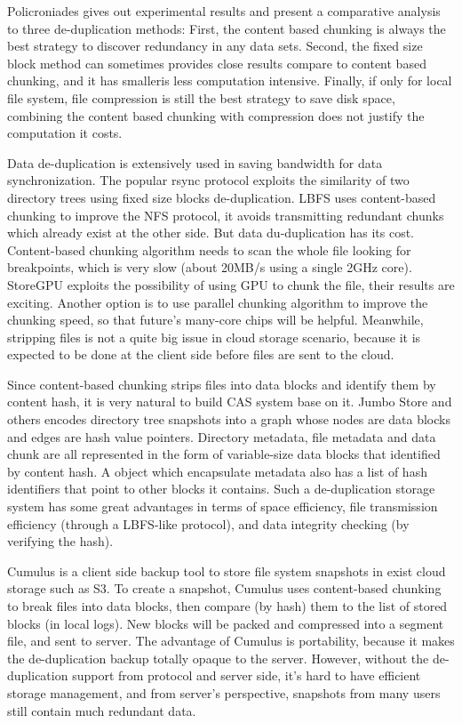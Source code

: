 Policroniades\cite{poli04} gives out
experimental results and present a comparative analysis
to three de-duplication methods: First, the content based chunking
is always the best strategy to discover redundancy in any data sets.
Second, the fixed size block method can sometimes provides
close results compare to content based chunking, and it has smalleris less
computation intensive. Finally, if only for local file system,
file compression is still the
best strategy to save disk space, combining the content based chunking
with compression does not justify the computation it costs.

Data de-duplication is extensively used in saving bandwidth for data synchronization.
The popular rsync\cite{rsync} protocol exploits the similarity of two directory trees
using fixed size blocks de-duplication. 
LBFS uses content-based chunking to improve the NFS protocol, 
it avoids transmitting redundant chunks which already exist at the other side.
But data du-duplication has its cost. Content-based chunking algorithm needs to
scan the whole file looking for breakpoints, which is very slow (about 20MB/s using a single 2GHz core). 
StoreGPU\cite{storegpu08}
exploits the possibility of using GPU to chunk the file,
their results are exciting. Another option is to use parallel
chunking algorithm to improve the chunking speed,
so that future's many-core chips will be helpful. 
Meanwhile, stripping files is not a quite big issue in cloud storage scenario,
because it is expected to be done at the client side before files are
sent to the cloud.

Since content-based chunking strips files into data blocks 
and identify them by content hash,
it is very natural to build CAS system base on it.
Jumbo Store and others\cite{jumbo07,efficient_dedup05,you06} encodes directory tree snapshots
into a graph whose nodes are data blocks and edges
are hash value pointers.
Directory metadata, file metadata and data chunk are all
represented in the form of variable-size data blocks that identified by content hash.
A object which encapsulate metadata also has a list of hash identifiers 
that point to other blocks it contains.
Such a de-duplication storage system has some great advantages 
in terms of space efficiency, file transmission efficiency (through a LBFS-like protocol), 
and data integrity checking (by verifying the hash).

Cumulus\cite{cumulus09} is a client side backup tool to store 
file system snapshots in exist cloud storage such as S3.
To create a snapshot, Cumulus uses content-based chunking to break files into data blocks,
then compare (by hash) them to the list of stored blocks (in local logs).
New blocks will be packed and compressed into a segment file, and sent to server.
The advantage of Cumulus is portability, because it makes 
the de-duplication backup totally opaque to the server.
However, without the de-duplication support from protocol and server side, 
it's hard to have efficient storage management, and from server's perspective,
snapshots from many users still contain much redundant data.


